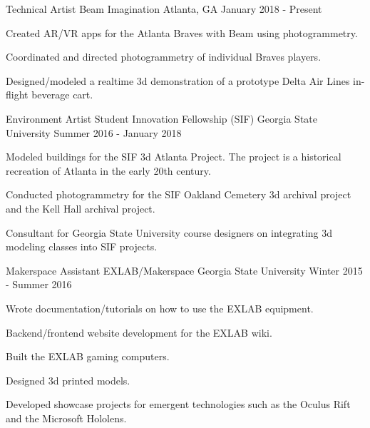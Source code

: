 

\begin{cventries}

  \cventry
    {Technical Artist} %
	{Beam Imagination} %
    {Atlanta, GA} %
	{January 2018 - Present} %
    {
      \begin{cvitems} %
	  	\item {Created AR/VR apps for the Atlanta Braves with Beam using photogrammetry.}
        \item {Coordinated and directed photogrammetry of individual Braves players.}
        \item {Designed/modeled a realtime 3d demonstration of a prototype Delta Air Lines in-flight beverage cart.}
      \end{cvitems}
    }

  \cventry
    {Environment Artist} %
	{Student Innovation Fellowship (SIF)} %
    {Georgia State University} %
    {Summer 2016 - January 2018} %
    {
      \begin{cvitems} %
        \item {Modeled buildings for the SIF 3d Atlanta Project. The project is a historical recreation of Atlanta in the early 20th century.}
        \item {Conducted photogrammetry for the SIF Oakland Cemetery 3d archival project and the Kell Hall archival project.}
        \item {Consultant for Georgia State University course designers on integrating 3d modeling classes into SIF projects.}
      \end{cvitems}
    }

  \cventry
    {Makerspace Assistant} %
	{EXLAB/Makerspace} %
    {Georgia State University} %
    {Winter 2015 - Summer 2016} %
    {
      \begin{cvitems} %
        \item {Wrote documentation/tutorials on how to use the EXLAB equipment.}
        \item {Backend/frontend website development for the EXLAB wiki.}
		\item {Built the EXLAB gaming computers.}
		\item {Designed 3d printed models.}
		\item {Developed showcase projects for emergent technologies such as the Oculus Rift and the Microsoft Hololens.}
      \end{cvitems}
    }


\end{cventries}

